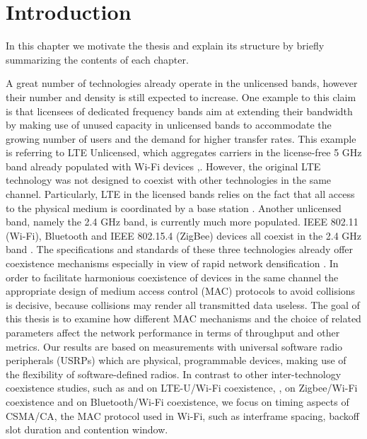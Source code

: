 \chapter{Introduction}
\label{ch:introduction}

In this chapter we motivate the thesis and explain its structure by briefly summarizing the contents of each chapter.

A great number of technologies already operate in the unlicensed bands, however their number and density is still expected to increase. One example to this claim is that licensees of dedicated frequency bands aim at extending their bandwidth by making use of unused capacity in unlicensed bands to accommodate the growing number of users and the demand for higher transfer rates. This example is referring to LTE Unlicensed, which aggregates carriers in the license-free 5 GHz band already populated with Wi-Fi devices \cite{nihtilä13},\cite{qualcomm15}. However, the original LTE technology was not designed to coexist with other technologies in the same channel. Particularly, LTE in the licensed bands relies on the fact that all access to the physical medium is coordinated by a base station \cite{ghosh10}. Another unlicensed band, namely the 2.4 GHz band, is currently much more populated. IEEE 802.11 (Wi-Fi), Bluetooth and IEEE 802.15.4 (ZigBee) devices all coexist in the 2.4 GHz band \cite{lee07}. The specifications and standards of these three technologies already offer coexistence mechanisms especially in view of rapid network densification \cite{bhushan14}. In order to facilitate harmonious coexistence of devices in the same channel the appropriate design of medium access control (MAC) protocols to avoid collisions is decisive, because collisions may render all transmitted data useless. The goal of this thesis is to examine how different MAC mechanisms and the choice of related parameters affect the network performance in terms of throughput and other metrics. Our results are based on measurements with universal software radio peripherals (USRPs) which are physical, programmable devices, making use of the flexibility of software-defined radios. In contrast to other inter-technology coexistence studies, such as \cite{gomezmiguelez16} and \cite{capretti16} on LTE-U/Wi-Fi coexistence, \cite{zhang11}, \cite{yi11} on Zigbee/Wi-Fi coexistence and \cite{chiasserini02} on Bluetooth/Wi-Fi coexistence, we focus on timing aspects of CSMA/CA, the MAC protocol used in Wi-Fi, such as interframe spacing, backoff slot duration and contention window.

